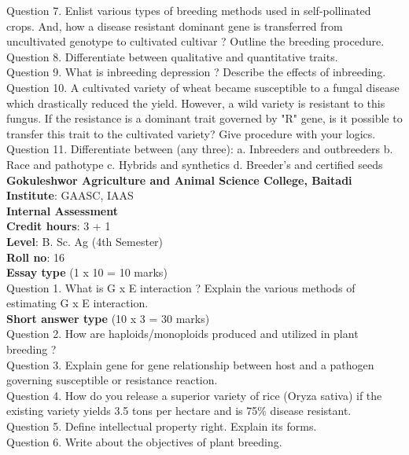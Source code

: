 \documentclass[12pt]{article}\usepackage[]{graphicx}\usepackage[]{color}
\begin{document}
Question 7. Enlist various types of breeding methods used in self-pollinated crops. And, how a disease resistant dominant gene is transferred from uncultivated genotype to cultivated cultivar ? Outline the breeding procedure.\\
Question 8. Differentiate between qualitative and quantitative traits.\\
Question 9. What is inbreeding depression ? Describe the effects of inbreeding.\\
Question 10. A cultivated variety of wheat became susceptible to a fungal disease which drastically reduced the yield. However, a wild variety is resistant to this fungus. If the resistance is a dominant trait governed by "R" gene, is it possible to transfer this trait to the cultivated variety? Give procedure with your logics.\\
Question 11. Differentiate between (any three): a. Inbreeders and outbreeders b. Race and pathotype c. Hybrids and synthetics d. Breeder's and certified seeds\\
\clearpage 
{\centering \Large{\textbf{Gokuleshwor Agriculture and Animal Science College, Baitadi}} \\[0.25cm]
            \textbf{Institute}: GAASC, IAAS \\[0.2cm]
            \textbf{Internal Assessment} \\[0.2cm]} 
\textbf{Credit hours}: 3 + 1 \\ 
\textbf{Level}: B. Sc. Ag (4th Semester) \\
\textbf{Roll no}: 16 \\[0.5cm] 
\textbf{Essay type} (1 x 10 = 10 marks) \\
Question 1. What is G x E interaction ? Explain the various methods of estimating G x E interaction.\\
\textbf{Short answer type} (10 x 3 = 30 marks) \\
Question 2. How are haploids/monoploids produced and utilized in plant breeding ?\\
Question 3. Explain gene for gene relationship between host and a pathogen governing susceptible or resistance reaction.\\
Question 4. How do you release a superior variety of rice (Oryza sativa) if the existing variety yields 3.5 tons per hectare and is 75\% disease resistant.\\
Question 5. Define intellectual property right. Explain its forms.\\
Question 6. Write about the objectives of plant breeding.\\
\end{document}
